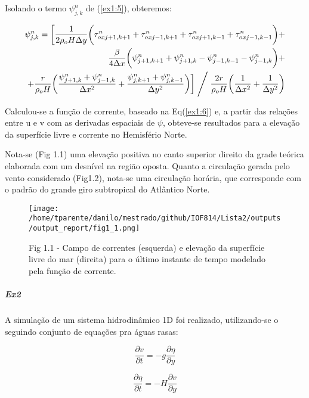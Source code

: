 \documentclass[11pt]{article}
\makeatletter
\def\maxwidth{\ifdim\Gin@nat@width>\linewidth\linewidth
    \else\Gin@nat@width\fi}
\let\Oldincludegraphics\includegraphics
\renewcommand{\includegraphics}[1]{\Oldincludegraphics[width=.8\maxwidth]{#1}}
\makeatother
\begin{document}
Isolando o termo \(\psi^{n}_{j,k}\) de (\ref{ex1:5}), obteremos:

\begin{equation}
\begin{aligned}
\psi^{n}_{j,k} = \bigg[ \frac{1}{2\rho_oH\Delta{y}}\bigg( \tau^{n}_{ox j+1,k+1} + \tau^{n}_{ox j-1,k+1} + \tau^{n}_{ox j+1,k-1} + \tau^{n}_{ox j-1,k-1} \bigg)  + \\
\frac{\beta}{4\Delta{x}}\bigg( \psi^{n}_{j+1,k+1} + \psi^{n}_{j+1,k} - \psi^{n}_{j-1,k-1} - \psi^{n}_{j-1,k} \bigg) + \\
+ \frac{r}{\rho_oH}\bigg( \frac{\psi^{n}_{j+1,k} + \psi^{n}_{j-1,k}}{\Delta{x^2}} + \frac{\psi^{n}_{j,k+1} + \psi^{n}_{j,k-1}}{\Delta{y^2}}\bigg)\bigg] \Biggm/ \frac{2r}{\rho_oH}\bigg( \frac{1}{\Delta{x^2}} + \frac{1}{\Delta{y^2}} \bigg)
\label{ex1:6}
\end{aligned}
\end{equation}

Calculou-se a função de corrente, baseado na Eq(\ref{ex1:6}) e, a partir
das relações entre u e v com as derivadas espaciais de \(\psi\),
obteve-se resultados para a elevação da superfície livre e corrente no
Hemisfério Norte.

Nota-se (Fig 1.1) uma elevação positiva no canto superior direito da
grade teórica elaborada com um desnível na região oposta. Quanto a
circulação gerada pelo vento considerado (Fig1.2), nota-se uma
circulação horária, que corresponde com o padrão do grande giro
subtropical do Atlântico Norte.


\begin{figure}[!ht]
\centering
\centerline{\hbox{\texttt{[image: /home/tparente/danilo/mestrado/github/IOF814/Lista2/outputs/output\_report/fig1\_1.png]}}}
\caption{Fig 1.1 - Campo de correntes (esquerda) e elevação da superfície livre do mar (direita) para o último
 instante de tempo modelado pela função de corrente.}
\label{fig1:1}
\end{figure}

\dotfill

    \subparagraph{Ex2}\label{ex2}

A simulação de um sistema hidrodinâmico 1D foi realizado, utilizando-se
o seguindo conjunto de equações pra águas rasas:

\begin{equation}
    \frac{\partial{v}}{\partial{t}} = - g\frac{\partial{\eta}}{\partial{y}}
    \label{ex2:1}
\end{equation}

\begin{equation}
    \frac{\partial{\eta}}{\partial{t}} = -H\frac{\partial{v}}{\partial{y}}
    \label{ex2:2}
\end{equation}
\end{document}
